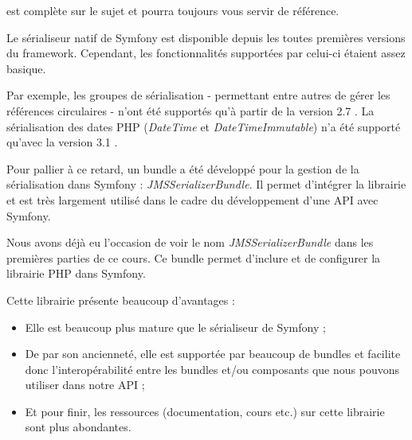 \documentclass[big]{zmdocument}
\begin{document}
 est complète sur le sujet et pourra toujours vous servir de référence.





Le sérialiseur natif de Symfony est disponible depuis les toutes premières versions du framework. Cependant, les fonctionnalités supportées par celui-ci étaient assez basique.



Par exemple, les groupes de sérialisation - permettant entre autres de gérer les références circulaires - n'ont été supportés qu'à partir de la version 2.7 . La sérialisation des dates PHP (\textit{DateTime} et \textit{DateTimeImmutable}) n'a été supporté qu'avec la version 3.1 .



Pour pallier à ce retard, un bundle a été développé pour la gestion de la sérialisation dans Symfony : \textit{JMSSerializerBundle}. Il permet d'intégrer la librairie  et est très largement utilisé dans le cadre du développement d'une API avec Symfony.





Nous avons déjà eu l'occasion de voir le nom \textit{JMSSerializerBundle} dans les premières parties de ce cours.
Ce bundle permet d'inclure et de configurer la librairie PHP  dans Symfony.



Cette librairie présente beaucoup d'avantages :



\begin{itemize}
\item Elle est beaucoup plus mature que le sérialiseur de Symfony ;
\item De par son ancienneté, elle est supportée par beaucoup de bundles et facilite donc l'interopérabilité entre les bundles et/ou composants que nous pouvons utiliser dans notre API ;
\item Et pour finir, les ressources (documentation, cours etc.) sur cette librairie sont plus abondantes.
\end{itemize}
\end{document}
